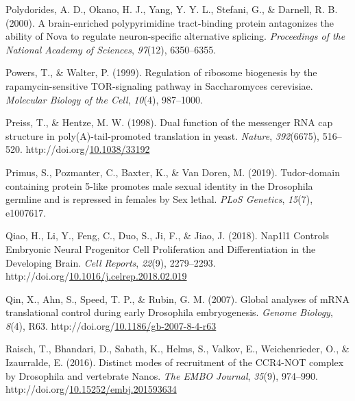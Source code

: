 \documentclass[12pt,oneside]{reedthesis}
\newlength{\cslhangindent}
\newenvironment{CSLReferences}[2] %
 {%
  \setlength{\parindent}{0pt}
  \ifodd #1 \everypar{\setlength{\hangindent}{\cslhangindent}}\ignorespaces\fi
  \ifnum #2 > 0
  \setlength{\parskip}{#2\baselineskip}
  \fi
 }%
 {}
\begin{document}
\begin{CSLReferences}{1}{0}
\leavevmode{}%
Polydorides, A. D., Okano, H. J., Yang, Y. Y. L., Stefani, G., \& Darnell, R. B. (2000). A brain-enriched polypyrimidine tract-binding protein antagonizes the ability of {Nova} to regulate neuron-specific alternative splicing. \emph{Proceedings of the National Academy of Sciences}, \emph{97}(12), 6350--6355.

\leavevmode{}%
Powers, T., \& Walter, P. (1999). Regulation of ribosome biogenesis by the rapamycin-sensitive {TOR}-signaling pathway in {Saccharomyces} cerevisiae. \emph{Molecular Biology of the Cell}, \emph{10}(4), 987--1000.

\leavevmode{}%
Preiss, T., \& Hentze, M. W. (1998). Dual function of the messenger {RNA} cap structure in poly({A})-tail-promoted translation in yeast. \emph{Nature}, \emph{392}(6675), 516--520. http://doi.org/\href{https://doi.org/10.1038/33192}{10.1038/33192}

\leavevmode{}%
Primus, S., Pozmanter, C., Baxter, K., \& Van Doren, M. (2019). Tudor-domain containing protein 5-like promotes male sexual identity in the {Drosophila} germline and is repressed in females by {Sex} lethal. \emph{PLoS Genetics}, \emph{15}(7), e1007617.

\leavevmode{}%
Qiao, H., Li, Y., Feng, C., Duo, S., Ji, F., \& Jiao, J. (2018). Nap1l1 {Controls Embryonic Neural Progenitor Cell Proliferation} and {Differentiation} in the {Developing Brain}. \emph{Cell Reports}, \emph{22}(9), 2279--2293. http://doi.org/\href{https://doi.org/10.1016/j.celrep.2018.02.019}{10.1016/j.celrep.2018.02.019}

\leavevmode{}%
Qin, X., Ahn, S., Speed, T. P., \& Rubin, G. M. (2007). Global analyses of {mRNA} translational control during early {Drosophila} embryogenesis. \emph{Genome Biology}, \emph{8}(4), R63. http://doi.org/\href{https://doi.org/10.1186/gb-2007-8-4-r63}{10.1186/gb-2007-8-4-r63}

\leavevmode{}%
Raisch, T., Bhandari, D., Sabath, K., Helms, S., Valkov, E., Weichenrieder, O., \& Izaurralde, E. (2016). Distinct modes of recruitment of the {CCR4}-{NOT} complex by {Drosophila} and vertebrate {Nanos}. \emph{The EMBO Journal}, \emph{35}(9), 974--990. http://doi.org/\href{https://doi.org/10.15252/embj.201593634}{10.15252/embj.201593634}


\end{CSLReferences}
\end{document}
